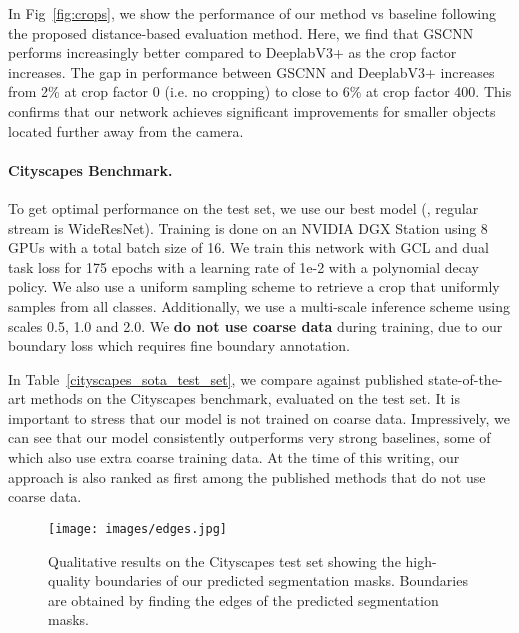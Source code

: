 \documentclass[10pt,twocolumn,letterpaper]{article}
\begin{document}
In Fig~\ref{fig:crops}, we show the performance of our method vs baseline following the proposed distance-based evaluation method. 
Here, we find  that GSCNN performs increasingly better compared to DeeplabV3+ as the crop factor increases. The gap in performance between GSCNN and DeeplabV3+ increases from 2\% at crop factor 0 (i.e. no cropping) to close to 6\% at crop factor 400. 
This confirms that our network achieves significant improvements for smaller objects located further away from the camera.

\vspace{-4mm}
\paragraph{Cityscapes Benchmark.} 
To get optimal performance on the test set, we use our best model (\ie, regular stream is WideResNet). Training is done on an NVIDIA DGX Station using 8 GPUs with a total batch size of 16. We train this network with GCL and dual task loss for 175 epochs with a learning rate of 1e-2 with a polynomial decay policy. We also use a uniform sampling scheme to retrieve a  crop that uniformly samples from all classes.
Additionally, we use a multi-scale inference scheme using scales 0.5, 1.0 and 2.0.
We {\bf do not use coarse data} during training, due to our boundary loss which requires fine boundary annotation.

In Table~\ref{cityscapes_sota_test_set}, we compare against published state-of-the-art methods on the Cityscapes benchmark, evaluated on the test set. 
It is important to stress that  our model is not trained on coarse data.
Impressively, we can see that our model consistently outperforms very strong baselines, some of which also use extra coarse training data. At the time of this writing, our approach is also ranked as first among the published methods that do not use coarse data.

\begin{figure*}[th!]
 
\centering
\texttt{[image: images/edges.jpg]} 
\vspace{-7mm}
\caption{Qualitative results on the Cityscapes test set showing the high-quality boundaries of our predicted segmentation masks. Boundaries are obtained by finding the edges of the predicted segmentation masks.}
\label{fig:testsetboundary}
 \vspace{-3mm}
\end{figure*}
\end{document}
